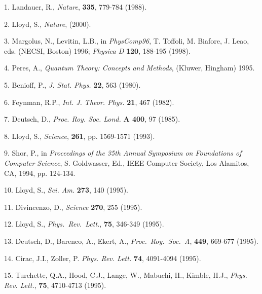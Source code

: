 \vfill\eject

\bigskip{}

\item{1.} Landauer, R., {\it Nature}, {\bf 335}, 779-784 (1988).

\item{2.} Lloyd, S., {\it  Nature}, (2000).

\item{3.} Margolus, N., Levitin, L.B., in {\it PhysComp96}, T. Toffoli,
M. Biafore, J. Leao, eds. (NECSI, Boston) 1996; {\it Physica D} {\bf 120}, 
188-195 (1998). 

\item{4.} Peres, A., {\it Quantum Theory:
Concepts and Methods}, (Kluwer, Hingham) 1995.  

\item{5.} Benioff, P., {\it J. Stat. Phys.} {\bf 22}, 563
(1980). 

\item{6.} Feynman, R.P., {\it Int. J. Theor.
Phys.} {\bf 21}, 467 (1982).

\item{7.} Deutsch, D., {\it Proc. Roy. Soc. Lond.} {\bf A 400},
97 (1985). 

\item{8.} Lloyd, S., {\it Science}, {\bf 261}, pp. 1569-1571 (1993).

\item{9.} Shor, P., in 
{\it Proceedings of the 35th Annual Symposium on Foundations
of Computer Science}, S. Goldwasser, Ed., IEEE Computer
Society, Los Alamitos, CA, 1994, pp. 124-134.

\item{10.} Lloyd, S., {\it Sci. Am.} {\bf 273}, 140 (1995).

\item{11.} Divincenzo, D., {\it Science} {\bf 270}, 255 (1995).
 
\item{12.} Lloyd, S., {\it Phys.\ Rev.\ Lett.\/}, {\bf 75},
346-349 (1995).

\item{13.} Deutsch, D., Barenco, A., Ekert, A., {\it Proc.\
Roy.\ Soc.\ A}, {\bf 449}, 669-677 (1995).
 
\item{14.} Cirac, J.I., Zoller, P. {\it Phys. Rev. Lett.} {\bf 74}, 
4091-4094 (1995).

\item{15.} Turchette, Q.A., Hood, C.J., Lange, W., Mabuchi, H.,
Kimble, H.J., {\it Phys. Rev. Lett.}, {\bf 75}, 4710-4713 (1995).

